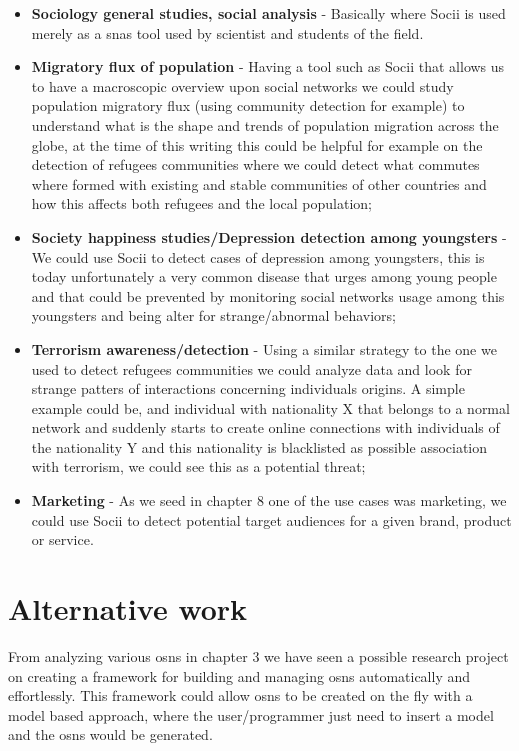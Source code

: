 \begin{itemize}
    \item \textbf{Sociology general studies, social analysis} - Basically where Socii is used merely as a \glspl{sna} tool used by scientist and students of the field.
    \item \textbf{Migratory flux of population} - Having a tool such as Socii that allows us to have a macroscopic overview upon social networks we could study population migratory flux (using community detection for example) to understand what is the shape and trends of population migration across the globe, at the time of this writing this could be helpful for example on the detection of refugees communities where we could detect what commutes where formed with existing and stable communities of other countries and how this affects both refugees and the local population;
    \item \textbf{Society happiness studies/Depression detection among youngsters} - We could use Socii to detect cases of depression among youngsters, this is today
    unfortunately a very common disease that urges among young people and that could be prevented by monitoring social networks usage among this youngsters and being alter
    for strange/abnormal behaviors;
    \item \textbf{Terrorism awareness/detection} - Using a similar strategy to the one we used to detect refugees communities we could analyze data and look for strange patters of interactions concerning individuals origins. A simple example could be, and individual with nationality X that belongs to a normal network and suddenly starts to create online connections with individuals of the nationality Y and this nationality is blacklisted as possible association with terrorism, we could see this as a potential threat;
    \item \textbf{Marketing} - As we seed in chapter 8 one of the use cases was marketing, we could use Socii to detect potential target audiences for a given brand, product or service.
\end{itemize}

\section{Alternative work}
From analyzing various \glspl{osn} in chapter 3 we have seen a possible research project on creating a framework for building
and managing \glspl{osn} automatically and effortlessly. This framework could allow \glspl{osn} to be created on the fly with a model based approach, where the user/programmer
just need to insert a model and the \glspl{osn} would be generated.

